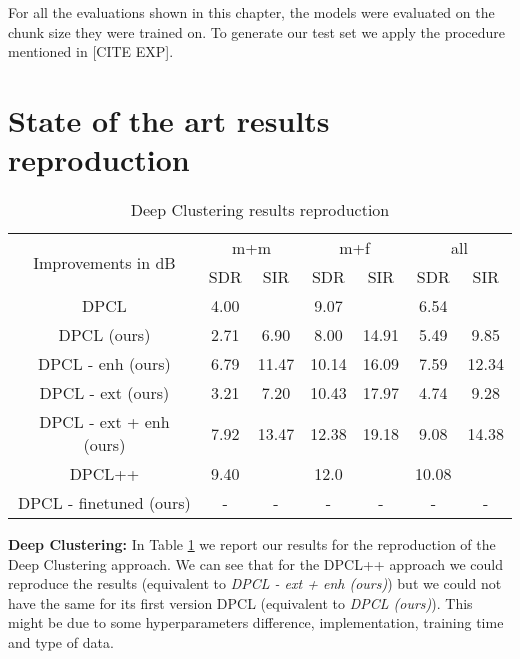 \documentclass[master,final,11pt]{iscs-thesis}
\begin{document}
For all the evaluations shown in this chapter, the models were evaluated on the chunk size they were trained on. To generate our test set we apply the procedure mentioned in [CITE EXP].
 
\section{State of the art results reproduction}

\begin{table}[ht]
\centering
\begin{tabular}{c|c|c|c|c|c|c}
\multirow{2}{*}{Improvements in dB} & \multicolumn{2}{c|}{m+m} & \multicolumn{2}{c|}{m+f} & \multicolumn{2}{c}{all} \\ 
\cline{2-7} 
 & SDR & SIR & SDR & SIR & SDR & SIR \\ 
\hline 
DPCL \cite{DPCLV1} & 4.00 &  & 9.07 &  & 6.54 &  \\ 
DPCL (ours) & 2.71 & 6.90 & 8.00 & 14.91 & 5.49 & 9.85 
\\ 
\hline 
\hline 
DPCL - enh (ours) & 6.79 & 11.47 & 10.14 & 16.09 & 7.59 & 12.34 \\ 
DPCL - ext (ours) & 3.21 & 7.20 & 10.43 & 17.97 & 4.74 & 9.28 \\ 
DPCL - ext + enh (ours) & 7.92 & 13.47 & 12.38 & 19.18 & 9.08 & 14.38 \\ 
\hline 
\hline 
DPCL++ \cite{DPCLV2} & 9.40 &  & 12.0 &  & 10.08 &  \\ 
DPCL - finetuned (ours) & - & - & - & - & - & - \\ 
\end{tabular}
\captionsetup{justification=centering}
\caption{Deep Clustering results reproduction}
\label{table:DPCLreprod}
\end{table}

\textbf{Deep Clustering:} In Table \ref{table:DPCLreprod} we report our results for the reproduction of the Deep Clustering approach. We can see that for the DPCL++ \cite{DPCLV2} approach we could reproduce the results (equivalent to \textit{DPCL - ext + enh (ours)}) but we could not have the same for its first version DPCL \cite{DPCLV1} (equivalent to \textit{DPCL (ours)}). This might be due to some hyperparameters difference, implementation, training time and type of data.
\end{document}
